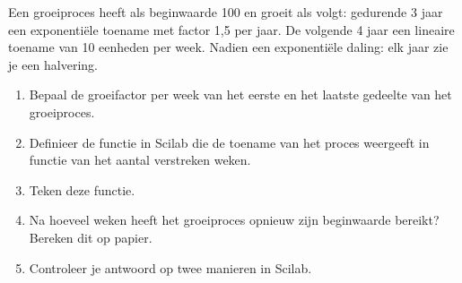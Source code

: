 \begin{oef}
Een groeiproces heeft als beginwaarde 100 en groeit als volgt:
gedurende 3 jaar een exponenti\"ele toename met factor 1,5 per jaar. 
De volgende 4 jaar een lineaire toename van 10 eenheden per week.
Nadien een exponenti\"ele daling: elk jaar zie je een halvering. 
\begin{enumerate}
  \item Bepaal de groeifactor per week van het eerste en het laatste gedeelte van het groeiproces.
  \item Definieer de functie in Scilab die de toename van het proces weergeeft in functie van het aantal verstreken weken.
  \item Teken deze functie.
  \item Na hoeveel weken heeft het groeiproces opnieuw zijn beginwaarde bereikt? Bereken dit op papier.
  \item Controleer je antwoord op twee manieren in Scilab.
\end{enumerate}
\end{oef}


